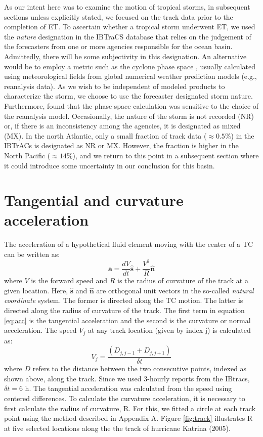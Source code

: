 \documentclass[wcd,manuscript]{copernicus}
\begin{document}
 As our intent here was to examine the motion of tropical storms, in subsequent sections unless explicitly stated,  we focused on the track data prior to the completion of ET. To ascertain whether a tropical storm underwent ET, we used the \emph{nature} designation in the IBTraCS database that relies on the judgement of the forecasters from one or more agencies responsible for the ocean basin.  Admittedly, there will be some subjectivity in this designation. An alternative would be to employ a metric such as the cyclone phase space \citep{Hart2003}, usually calculated using meteorological fields from global numerical weather prediction models (e.g., reanalysis data). As we wish to be independent of modeled products to characterize the storm, we choose to use the forecaster designated storm nature. Furthermore, \cite{BCSEH2019a} found that the phase space calculation was sensitive to the choice of the reanalysis model. Occasionally, the nature of the storm is not recorded (NR) or, if there is an inconsistency among the agencies, it is designated as mixed (MX). In the north Atlantic, only a small fraction of track data ($\approx 0.5\%$) in the IBTrACs is designated as NR or MX. However, the fraction is higher in the North Pacific ($\approx 14\%$), and we return to this point in a subsequent section where it could introduce some uncertainty in our conclusion for this basin.
 
 
\section{Tangential and curvature acceleration}
The acceleration of a hypothetical fluid element moving with the center of a TC can be written as:
%
\begin{equation}
    \mathbf{a} = \frac{dV}{dt} \mathbf{\hat{s}} + \frac{V^2}{R} \mathbf{\hat{n}} 
    \label{eq:acc}
\end{equation}
%
where $V$ is the forward speed and $R$ is the radius of curvature of the track at a given location. Here, $\mathbf{\hat{s}}$ and $\mathbf{\hat{n}}$ are orthogonal unit vectors in the so-called \emph{natural coordinate} system. The former is directed along the TC motion. The latter is directed along the radius of curvature of the track.  The first term in equation \ref{eq:acc} is the tangential acceleration and the second is the curvature or normal acceleration. The speed $V_j$ at any track location (given by index j)  is calculated as:
%
\begin{equation}
V_j = \frac{(D_{j,j-1} +  D_{j,j+1})}{\delta t}
\end{equation}
%
where $D$ refers to the distance between the two consecutive points, indexed as shown above, along the track. Since we used 3-hourly reports from the IBtracs, $\delta t = 6$ h. The tangential acceleration was calculated from the speed using centered differences. To calculate the curvature acceleration, it is necessary to first calculate the radius of curvature, R. For this, we  fitted a circle at each track point using the method described in Appendix A. Figure \ref{fig:track} illustrates R at five selected locations along the the track of hurricane Katrina (2005). 
\end{document}
